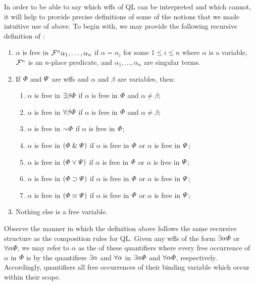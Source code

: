 In order to be able to say which wffs of QL can be interpreted and which cannot, it will help to provide precise definitions of some of the notions that we made intuitive use of above.
To begin with, we may provide the following recursive definition of :

\begin{enumerate}
  \item $\alpha$ is free in $\mathcal{F}^n\alpha_1,\ldots,\alpha_n$ if $\alpha=\alpha_i$ for some $1\leq i\leq n$ where $\alpha$ is a variable, $\mathcal{F}^n$ is an $n$-place predicate, and $\alpha_1,\ldots,\alpha_n$ are singular terms.
  \item If $\varPhi$ and $\varPsi$ are wffs and $\alpha$ and $\beta$ are variables, then:
    \begin{enumerate}
        \item $\alpha$ is free in $\exists \beta\varPhi$ if $\alpha$ is free in $\varPhi$ and $\alpha\neq\beta$;
        \item $\alpha$ is free in $\forall \beta\varPhi$ if $\alpha$ is free in $\varPhi$ and $\alpha\neq\beta$;
        \item $\alpha$ is free in $\enot\metaA$ if $\alpha$ is free in $\varPhi$;
        \item $\alpha$ is free in $(\varPhi\mathrel\&\varPsi)$ if $\alpha$ is free in $\varPhi$ or $\alpha$ is free in $\varPsi$;
        \item $\alpha$ is free in $(\varPhi\mkern1mu\vee\mkern1mu\varPsi)$ if $\alpha$ is free in $\varPhi$ or $\alpha$ is free in $\varPsi$;
        \item $\alpha$ is free in $(\varPhi\supset\varPsi)$ if $\alpha$ is free in $\varPhi$ or $\alpha$ is free in $\varPsi$;
        \item $\alpha$ is free in $(\varPhi\equiv\varPsi)$ if $\alpha$ is free in $\varPhi$ or $\alpha$ is free in $\varPsi$;
    \end{enumerate}
  \item Nothing else is a free variable. 
\end{enumerate}

Observe the manner in which the definition above follows the same recursive structure as the composition rules for QL.
Given any wffs of the form $\exists \alpha \varPhi$ or $\forall \alpha \varPhi$, we may refer to $\alpha$ as the  of these quantifiers where every free occurrence of $\alpha$ in $\varPhi$ is  by the quantifiers $\exists \alpha$ and $\forall \alpha$ in $\exists \alpha \varPhi$ and $\forall \alpha \varPhi$, respectively. 
Accordingly, quantifiers  all free occurrences of their binding variable which occur within their scope.

